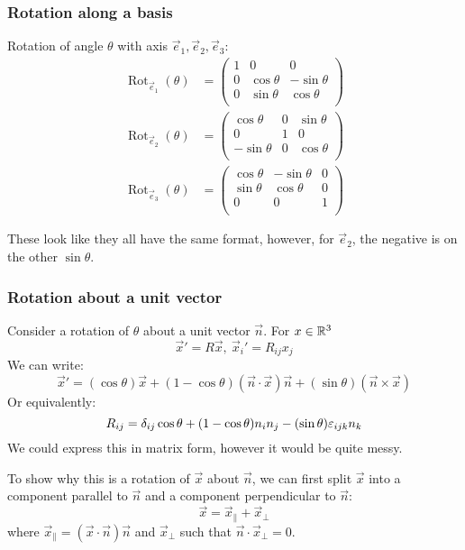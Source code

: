 \documentclass[../main.tex]{subfiles}
\DeclareMathOperator{\Rot}{Rot}
\begin{document}
\subsubsection{Rotation along a basis}
Rotation of angle $\theta$ with axis $\vec{e}_1, \vec{e}_2, \vec{e}_3$:
\begin{align*}
  \Rot_{\vec{e}_1}(\theta) &= \begin{pmatrix}
  1 & 0 & 0 \\
  0 & \cos \theta & -\sin \theta \\
  0 & \sin \theta & \cos \theta \\
  \end{pmatrix} \\
  \Rot_{\vec{e}_2}(\theta) &= \begin{pmatrix}
  \cos \theta & 0 & \sin \theta \\
  0 & 1 & 0 \\
  - \sin \theta & 0 & \cos \theta \\
  \end{pmatrix} \\
  \Rot_{\vec{e}_3}(\theta) &= \begin{pmatrix}
  \cos \theta & -\sin \theta & 0 \\
  \sin \theta & \cos \theta & 0 \\
  0 & 0 & 1 \\
  \end{pmatrix}
\end{align*}
\begin{remark}[Warning]
  These look like they all have the same format, however, for $\vec{e}_2$, the negative is on the other $\sin \theta$.
\end{remark}
\subsubsection{Rotation about a unit vector}
Consider a rotation of $\theta$ about a unit vector $\vec{n}$.
For $x \in \mathbb{R}^{3}$
\[
  \vec{x}' = R\vec{x},\ \vec{x}_i' = R_{i j}x_j
\]
We can write:
\[
  \vec{x}' = (\cos \theta)\vec{x} + (1 - \cos \theta)(\vec{n} \cdot \vec{x})\vec{n} + (\sin \theta)(\vec{n} \times \vec{x})
\]
Or equivalently:
\[
  R_{i j} = \delta_{i j}\cos\theta + (1 - \cos \theta)n_in_j - (\sin \theta)\varepsilon_{i j k}n_k
\]
We could express this in matrix form, however it would be quite messy.

To show why this is a rotation of $\vec{x}$ about $\vec{n}$, we can first split $\vec{x}$ into a component parallel to $\vec{n}$ and a component perpendicular to $\vec{n}$:
\[
  \vec{x} = \vec{x}_{\parallel} + \vec{x}_{\perp}
\]
where $\vec{x}_{\parallel} = (\vec{x} \cdot \vec{n})\vec{n}$ and $\vec{x}_{\perp}$ such that $\vec{n} \cdot \vec{x}_{\perp} = 0$.
\end{document}
